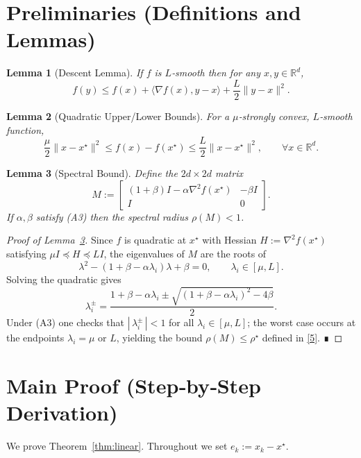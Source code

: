 \documentclass{article}
\newtheorem{lemma}{Lemma}
\newcommand{\R}{\mathbb{R}}
\begin{document}
\section*{Preliminaries (Definitions and Lemmas)}
\begin{lemma}[Descent Lemma]\label{lem:descent}
If $f$ is $L$‑smooth then for any $x,y\in\R^{d}$,
\[
f(y)\le f(x)+\langle\nabla f(x),y-x\rangle+\frac{L}{2}\|y-x\|^{2}.
\tag{L1}
\]
\end{lemma}
\begin{lemma}[Quadratic Upper/Lower Bounds]\label{lem:quad}
For a $\mu$‑strongly convex, $L$‑smooth function,
\[
\frac{\mu}{2}\|x-x^{\star}\|^{2}\le f(x)-f(x^{\star})\le\frac{L}{2}\|x-x^{\star}\|^{2},
\qquad\forall x\in\R^{d}.
\tag{L2}
\]
\end{lemma}
\begin{lemma}[Spectral Bound]\label{lem:spectral}
Define the $2d\times2d$ matrix
\[
M:=\begin{bmatrix}
(1+\beta)I-\alpha \nabla^{2}f(x^{\star}) & -\beta I\\[2mm]
I & 0
\end{bmatrix}.
\]
If $\alpha,\beta$ satisfy (A3) then the spectral radius $\rho(M)<1$.
\end{lemma}
\begin{proof}[Proof of Lemma~\ref{lem:spectral}]
Since $f$ is quadratic at $x^{\star}$ with Hessian $H:=\nabla^{2}f(x^{\star})$ satisfying $\mu I\preceq H\preceq L I$, the eigenvalues of $M$ are the roots of
\[
\lambda^{2}-(1+\beta-\alpha\lambda_{i})\lambda+\beta=0,\qquad \lambda_{i}\in[\mu,L].
\tag{S1}
\]
Solving the quadratic gives
\[
\lambda_{i}^{\pm}=\frac{1+\beta-\alpha\lambda_{i}\pm\sqrt{(1+\beta-\alpha\lambda_{i})^{2}-4\beta}}{2}.
\tag{S2}
\]
Under (A3) one checks that $|\,\lambda_{i}^{\pm}\,|<1$ for all $\lambda_{i}\in[\mu,L]$; the worst case occurs at the endpoints $\lambda_{i}=\mu$ or $L$, yielding the bound $\rho(M)\le\rho^{\star}$ defined in \eqref{5}.  ∎
\end{proof}

\section*{Main Proof (Step‑by‑Step Derivation)}
We prove Theorem~\ref{thm:linear}.  Throughout we set $e_{k}:=x_{k}-x^{\star}$.
\end{document}
